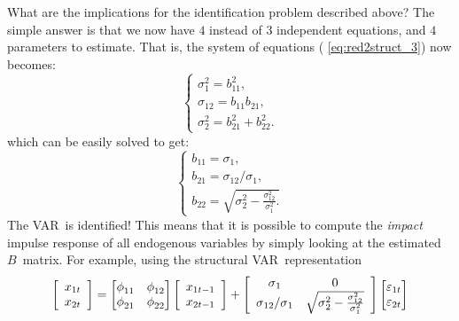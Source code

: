 \documentclass[10pt]{article}
\begin{document}
What are the implications for the identification problem described above?
The simple answer is that we now have $4$ instead of $3$ independent
equations, and $4$ parameters to estimate. That is, the system of equations (%
\ref{eq:red2struct_3}) now becomes:%
\begin{equation}
\left\{ 
\begin{array}{l}
\sigma _{1}^{2}=b_{11}^{2}, \\ 
\sigma _{12}=b_{11}b_{21}, \\ 
\sigma _{2}^{2}=b_{21}^{2}+b_{22}^{2}.%
\end{array}%
\right.  \label{eq:red2struct_ch}
\end{equation}%
which can be easily solved to get:%
\begin{equation*}
\left\{ 
\begin{array}{l}
b_{11}=\sigma _{1}, \\ 
b_{21}=\sigma _{12}/\sigma _{1}, \\ 
b_{22}=\sqrt{\sigma _{2}^{2}-\frac{\sigma _{12}^{2}}{\sigma _{1}^{2}}.}%
\end{array}%
\right.
\end{equation*}%
The VAR\ is identified! This means that it is possible to compute the \emph{%
impact} impulse response of all endogenous variables by simply looking at
the estimated $B$\ matrix. For example, using the structural VAR\
representation 
\begin{equation*}
\left[ 
\begin{array}{c}
x_{1t} \\ 
x_{2t}%
\end{array}%
\right] =%
\begin{bmatrix}
\phi _{11} & \phi _{12} \\ 
\phi _{21} & \phi _{22}%
\end{bmatrix}%
\left[ 
\begin{array}{c}
x_{1t-1} \\ 
x_{2t-1}%
\end{array}%
\right] +\left[ 
\begin{array}{cc}
\sigma _{1} & 0 \\ 
\sigma _{12}/\sigma _{1} & \sqrt{\sigma _{2}^{2}-\frac{\sigma _{12}^{2}}{%
\sigma _{1}^{2}}}%
\end{array}%
\right] 
\begin{bmatrix}
\varepsilon _{1t} \\ 
\varepsilon _{2t}%
\end{bmatrix}%
\end{equation*}%
\end{document}
